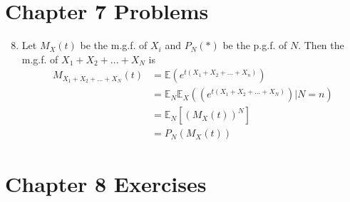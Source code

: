 \documentclass{article}
\begin{document}
\begin{enumerate}
\end{enumerate}

\section{Chapter 7 Problems}

\begin{enumerate}
    \setcounter{enumi}{7}
    \item 
    
    Let $M_X(t)$ be the m.g.f. of $X_i$ and $P_N(*)$ be the p.g.f. of $N$. Then the m.g.f. of $X_1+ X_2+ ...+ X_N$ is
    \begin{align*}
        M_{X_1+X_2+...+X_N}(t) &= \mathbb{E}(e^{t(X_1+X_2+...+X_n)})\\
        &= \mathbb{E}_N\mathbb{E}_X((e^{t(X_1+X_2+...+X_N)})|N=n)\\
        &= \mathbb{E}_N[(M_X(t))^N]\\
        &= P_N(M_X(t))
    \end{align*}
    
\end{enumerate}

\section{Chapter 8 Exercises}
\end{document}

